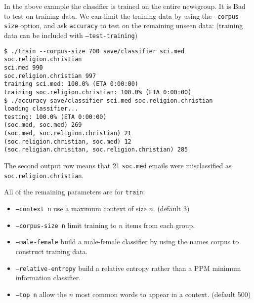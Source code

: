 \documentclass[a4]{article}
\begin{document}
In the above example the classifier is trained on the entire newsgroup.  It is
Bad to test on training data.  We can limit the training data by using the
\texttt{--corpus-size} option, and ask \texttt{accuracy} to test on the
remaining unseen data: (training data can be included with
\texttt{--test-training})

\begin{verbatim}
$ ./train --corpus-size 700 save/classifier sci.med soc.religion.christian
sci.med 990
soc.religion.christian 997
training sci.med: 100.0% (ETA 0:00:00)
training soc.religion.christian: 100.0% (ETA 0:00:00)
$ ./accuracy save/classifier sci.med soc.religion.christian
loading classifier...
testing: 100.0% (ETA 0:00:00)
(soc.med, soc.med) 269
(soc.med, soc.religion.christian) 21
(soc.religion.christian, soc.med) 12
(soc.religian.chrisitan, soc.religion.christian) 285
\end{verbatim}

The second output row means that 21 \texttt{soc.med} emails were
misclassified as \texttt{soc.religion.christian}.

All of the remaining parameters are for \texttt{train}:
\begin{itemize}
\item \texttt{--context n} use a maximum context of size $n$.  (default 3)
\item \texttt{--corpus-size n} limit training to $n$ items from each group.
\item \texttt{--male-female} build a male-female classifier by using the
names corpus to construct training data.
\item \texttt{--relative-entropy} build a relative entropy rather
than a PPM minimum information classifier.
\item \texttt{--top n} allow the $n$ most common words to appear in a context.
(default 500)
\end{itemize}
\end{document}
